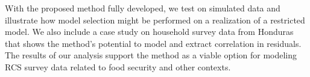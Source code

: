 
With the proposed method fully developed, we test on simulated data and illustrate how model selection might be performed on a realization of a restricted model. We also include a case study on household survey data from Honduras that shows the method's potential to model and extract correlation in residuals. The results of our analysis support the method as a viable option for modeling RCS survey data related to food security and other contexts.


